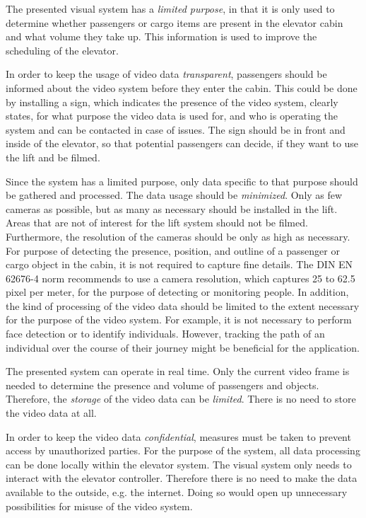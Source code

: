 The presented visual system has a \emph{limited purpose}, in that it is only used 
to determine whether passengers or cargo items are present in the elevator cabin 
and what volume they take up. 
This information is used to improve the scheduling of the elevator.

In order to keep the usage of video data \emph{transparent},
passengers should be informed about the video system before they enter the cabin.
This could be done by installing a sign, which indicates the presence of the video system, 
clearly states, for what purpose the video data is used for, 
and who is operating the system and can be contacted in case of issues.
The sign should be in front and inside of the elevator, 
so that potential passengers can decide,
if they want to use the lift and be filmed.

Since the system has a limited purpose, 
only data specific to that purpose should be gathered and processed.
The data usage should be \emph{minimized}.
Only as few cameras as possible, but as many as necessary should be installed in the lift.
Areas that are not of interest for the lift system should not be filmed.
Furthermore, the resolution of the cameras should be only as high as necessary.
For purpose of detecting the presence, position, and outline of a passenger or cargo object 
in the cabin, it is not required to capture fine details.
The DIN EN 62676-4 norm \autocite[][]{din2016surveillance} recommends 
to use a camera resolution, which captures 25 to 62.5 pixel per meter,
for the purpose of detecting or monitoring people.
In addition, the kind of processing of the video data should be limited to the extent necessary for the purpose of the video system. 
For example, it is not necessary to perform face detection  or to identify individuals.
However, tracking the path of an individual over the course of their journey might be beneficial for the application.

The presented system can operate in real time.
Only the current video frame is needed to determine the presence and volume of passengers and objects.
Therefore, the \emph{storage} of the video data can be \emph{limited}.
There is no need to store the video data at all.

In order to keep the video data \emph{confidential}, 
measures must be taken to prevent access by unauthorized parties.
For the purpose of the system, all data processing can be done locally within the elevator system.
The visual system only needs to interact with the elevator controller.
Therefore there is no need to make the data available to the outside, e.g. the internet.
Doing so would open up unnecessary possibilities for misuse of the video system.

